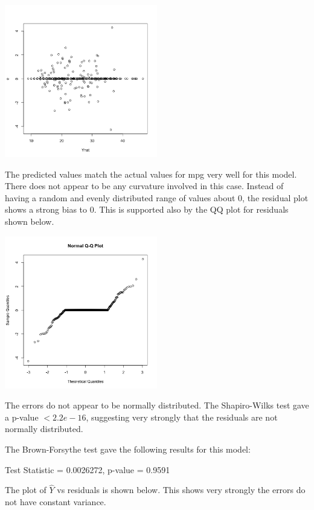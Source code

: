 \documentclass[11pt]{article}
\begin{document}
\begin{enumerate}
\begin{center}
\includegraphics[width=0.5\textwidth]{auto_Yhat_vs_e}
\end{center}

The predicted values match the actual values for mpg very well for this model. There 
does not appear to be any curvature involved in this case. Instead of having a random 
and evenly distributed range of values about $0$, the residual plot shows a strong bias 
to $0$. This is supported also by the QQ plot for residuals shown below. 

\begin{center}
\includegraphics[width=0.5\textwidth]{auto_residuals_qq_plot}
\end{center}

The errors do not appear to be normally distributed. The Shapiro-Wilks test 
gave a p-value $ < 2.2e-16$, suggesting very strongly that the residuals are not 
normally distributed. 

The Brown-Forsythe test gave the following results for this model: 

Test Statistic = 0.0026272, p-value = 0.9591

The plot of $\hat{Y}$ vs residuals is shown below. This shows very strongly the 
errors do not have constant variance. 


\end{enumerate}
\end{document}
